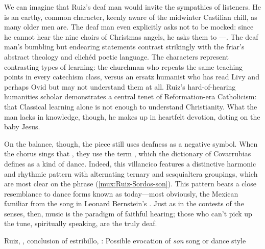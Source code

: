 We can imagine that Ruiz's deaf man would invite the sympathies of listeners.
He is an earthy, common character, keenly aware of the midwinter Castilian
chill, as many older men are.
The deaf man even explicitly asks not to be mocked: since he cannot hear the
nine choirs of Christmas angels, he asks them to ---.
The deaf man's bumbling but endearing statements contrast strikingly with the
friar's abstract theology and clichéd poetic language.
The characters represent contrasting types of learning: the churchman who
repeats the same teaching points in every catechism class, versus an ersatz
humanist who has read Livy and perhaps Ovid but may not understand them at all.
Ruiz's hard-of-hearing humanities scholar demonstrates a central tenet of
Reformation-era Catholicism: that Classical learning alone is not enough to
understand Christianity.%
    \Autocite
    [206{Erasmus perceived in the paganistic trends of the Renaissance
    a greater threat to religion than the theological squabbles he was so
    reluctant to participate in}.] 
    {Erasmus:Dolan}
What the man lacks in knowledge, though, he makes up in heartfelt devotion,
doting on the baby Jesus.

On the balance, though, the piece still uses deafness as a negative symbol.
When the chorus sings that , they use the term , which the dictionary of
Covarrubias defines as a kind of dance.
Indeed, this villancico features a distinctive harmonic and rhythmic pattern
with alternating ternary and sesquialtera groupings, which are most clear on the
phrase 
(\cref{mux:Ruiz-Sordos-son}).
This pattern bears a close resemblance to dance forms known as 
today---most obviously, the Mexican  familiar from the song
 in Leonard Bernstein's .%
    \Autocites
    []{Grove}
    {Wells:WestSideStory}
Just as in the contests of the senses, then, music is the paradigm of faithful
hearing; those who can't pick up the tune, spiritually speaking, are the truly
deaf.

{Ruiz, , conclusion of estribillo,
: Possible evocation of \emph{son} song or dance style}

